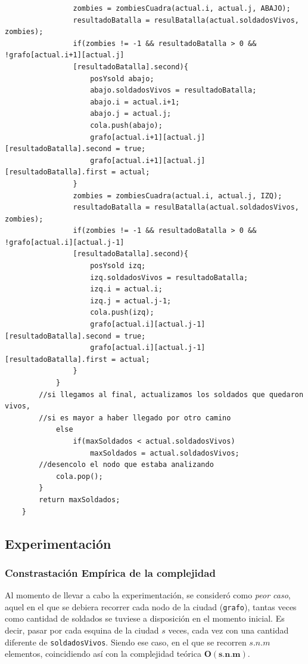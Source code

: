 	\begin{codesnippet}
	\begin{verbatim}
                zombies = zombiesCuadra(actual.i, actual.j, ABAJO);
                resultadoBatalla = resulBatalla(actual.soldadosVivos, zombies);
                if(zombies != -1 && resultadoBatalla > 0 && !grafo[actual.i+1][actual.j]
                [resultadoBatalla].second){
                    posYsold abajo;
                    abajo.soldadosVivos = resultadoBatalla;
                    abajo.i = actual.i+1;
                    abajo.j = actual.j;
                    cola.push(abajo);
                    grafo[actual.i+1][actual.j][resultadoBatalla].second = true;
                    grafo[actual.i+1][actual.j][resultadoBatalla].first = actual;
                }
                zombies = zombiesCuadra(actual.i, actual.j, IZQ);
                resultadoBatalla = resulBatalla(actual.soldadosVivos, zombies);
                if(zombies != -1 && resultadoBatalla > 0 && !grafo[actual.i][actual.j-1]
                [resultadoBatalla].second){
                    posYsold izq;
                    izq.soldadosVivos = resultadoBatalla;
                    izq.i = actual.i;
                    izq.j = actual.j-1;
                    cola.push(izq);
                    grafo[actual.i][actual.j-1][resultadoBatalla].second = true;
                    grafo[actual.i][actual.j-1][resultadoBatalla].first = actual;
                }
            }
        //si llegamos al final, actualizamos los soldados que quedaron vivos, 
        //si es mayor a haber llegado por otro camino
            else
                if(maxSoldados < actual.soldadosVivos)
                    maxSoldados = actual.soldadosVivos;
        //desencolo el nodo que estaba analizando
            cola.pop();
        }
        return maxSoldados;
    }
	\end{verbatim}
	\end{codesnippet}

\newpage

\subsection{Experimentaci\'on}
\subsubsection{Constrastaci\'on Emp\'irica de la complejidad}

Al momento de llevar a cabo la experimentaci\'on, se consideró como\emph{ peor caso}, aquel en el que se debiera recorrer cada nodo de la ciudad (\texttt{grafo}), tantas veces como cantidad de soldados se tuviese a disposici\'on en el momento inicial. Es decir, pasar por cada esquina de la ciudad $s$ veces, cada vez con una cantidad diferente de \texttt{soldadosVivos}. Siendo ese caso, en el que se recorren $s.n.m$ elementos, coincidiendo así con la complejidad teórica $\mathbf{O(s.n.m)}$.\\

